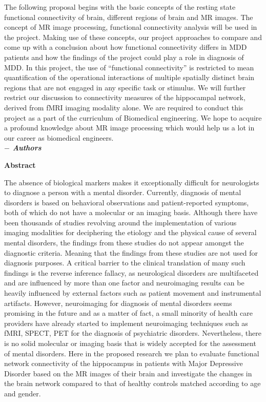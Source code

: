 \documentclass[12pt]{article}
\begin{document}
The following proposal begins with the basic concepts of the resting
state functional connectivity of brain, different regions of brain and
MR images. The concept of MR image processing, functional connectivity
analysis will be used in the project. Making use of these concepts,
our project approaches to compare and come up with a conclusion about
how functional connectivity differs in MDD patients and how the
findings of the project could play a role in diagnosis of MDD. In this
project, the use of ``functional connectivity'' is restricted to mean
quantification of the operational interactions of multiple spatially
distinct brain regions that are not engaged in any specific task or
stimulus. We will further restrict our discussion to connectivity
measures of the hippocampal network, derived from fMRI imaging
modality alone.  We are required to conduct this project as a part of
the curriculum of Biomedical engineering. We hope to acquire
a profound knowledge about MR image processing which would help us
a lot in our career as biomedical engineers. \\ [1cm]

\hspace*{138mm}\textbf{\textit {$-$ Authors}}
\newpage

\hskip180pt {\textbf{\centering \large Abstract} }
\vskip2pt

The absence of biological markers makes it exceptionally difficult for
neurologists to diagnose a person with a mental disorder. Currently,
diagnosis of mental disorders is based on behavioral observations and
patient-reported symptoms, both of which do not have a molecular or an
imaging basis. Although there have been thousands of studies revolving
around the implementation of various imaging modalities for
deciphering the etiology and the physical cause of several mental
disorders, the findings from these studies do not appear amongst the
diagnostic criteria. Meaning that the findings from these studies are
not used for diagnosis purposes. A critical barrier to the clinical
translation of many such findings is the reverse inference fallacy, as
neurological disorders are multifaceted and are influenced by more
than one factor and neuroimaging results can be heavily influenced by
external factors such as patient movement and instrumental
artifacts. However, neuroimaging for diagnosis of mental disorders
seems promising in the future and as a matter of fact, a small
minority of health care providers have already started to implement
neuroimaging techniques such as fMRI, SPECT, PET for the diagnosis of
psychiatric disorders. Nevertheless, there is no solid molecular or
imaging basis that is widely accepted for the assessment of mental
disorders. Here in the proposed research we plan to evaluate
functional network connectivity of the hippocampus in patients with
Major Depressive Disorder based on the MR images of their brain and
investigate the changes in the brain network compared to that of
healthy controls matched according to age and gender.
\newpage
\end{document}
